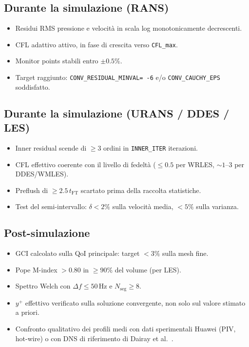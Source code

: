 \documentclass[11pt,a4paper]{article}
\newcommand{\ttcfg}[1]{\texttt{\color{codegray}#1}}
\newcommand{\tFT}{t_{\mathrm{FT}}}
\begin{document}
\subsection{Durante la simulazione (RANS)}

\begin{itemize}
  \item[\textbullet] Residui RMS pressione e velocità in scala log
    monotonicamente decrescenti.
  \item[\textbullet] CFL adattivo attivo, in fase di crescita verso
    \texttt{CFL\_max}.
  \item[\textbullet] Monitor points stabili entro $\pm 0.5\%$.
  \item[\textbullet] Target raggiunto: \ttcfg{CONV\_RESIDUAL\_MINVAL=
    -6} e/o \ttcfg{CONV\_CAUCHY\_EPS} soddisfatto.
\end{itemize}

\subsection{Durante la simulazione (URANS / DDES / LES)}

\begin{itemize}
  \item[\textbullet] Inner residual scende di $\geq 3$ ordini in
    \ttcfg{INNER\_ITER} iterazioni.
  \item[\textbullet] CFL effettivo coerente con il livello di fedeltà
    ($\le 0.5$ per WRLES, $\sim 1$--$3$ per DDES/WMLES).
  \item[\textbullet] Preflush di $\geq 2.5\,\tFT$ scartato prima della
    raccolta statistiche.
  \item[\textbullet] Test del semi-intervallo: $\delta < 2\%$ sulla
    velocità media, $< 5\%$ sulla varianza.
\end{itemize}

\subsection{Post-simulazione}

\begin{itemize}
  \item[\textbullet] GCI calcolato sulla QoI principale: target
    $< 3\%$ sulla mesh fine.
  \item[\textbullet] Pope M-index $> 0.80$ in $\geq 90\%$ del volume
    (per LES).
  \item[\textbullet] Spettro Welch con $\Delta f \leq 50$\,Hz e
    $N_{\mathrm{seg}} \geq 8$.
  \item[\textbullet] $y^+$ effettivo verificato sulla soluzione
    convergente, non solo sul valore stimato a priori.
  \item[\textbullet] Confronto qualitativo dei profili medi con dati
    sperimentali Huawei (PIV, hot-wire) o con DNS di riferimento di
    Dairay et al.\ \cite{Dairay2015}.
\end{itemize}
\end{document}
